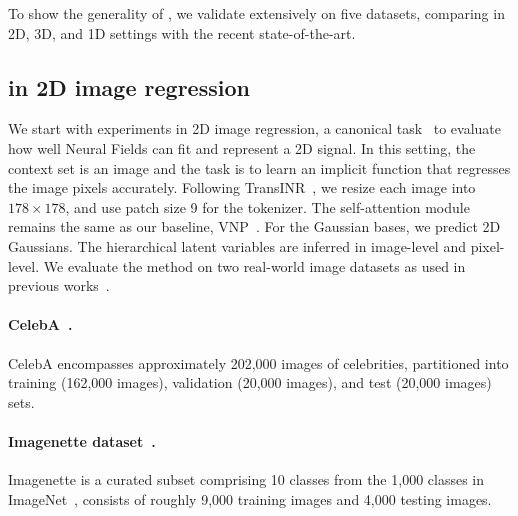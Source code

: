 

To show the generality of \name{}, we validate extensively on five datasets, comparing in 2D, 3D, and 1D settings with the recent state-of-the-art.

\subsection{\name{} in 2D image regression}

We start with experiments in 2D image regression, a canonical task~\citep{tancik2021learned,sitzmann2020implicit} to evaluate how well Neural Fields can fit and represent a 2D signal.
In this setting, the context set is an image and the task is to learn an implicit function that regresses the image pixels accurately. %
Following TransINR~\citep{chen2022transformers}, we resize each image into $178\times 178$, and use patch size 9 for the tokenizer. The self-attention module remains the same as 
our baseline, VNP~\citep{guo2023versatile}. 
For the Gaussian bases, we predict 2D Gaussians.
The hierarchical latent variables are inferred in image-level and pixel-level. 
We evaluate the method on two real-world image datasets as used in previous works~\citep{chen2022transformers,tancik2021learned,gu2023generalizable}.

\paragraph{CelebA~\citep{liu2015deep}.}
CelebA encompasses approximately 202,000 images of celebrities, partitioned into training (162,000 images), validation (20,000 images), and test (20,000 images) sets.

\paragraph{Imagenette dataset~\citep{imagenette}.}
Imagenette is a curated subset comprising 10 classes from the 1,000 classes in ImageNet~\citep{deng2009imagenet}, consists of roughly 9,000 training images and 4,000 testing images.


